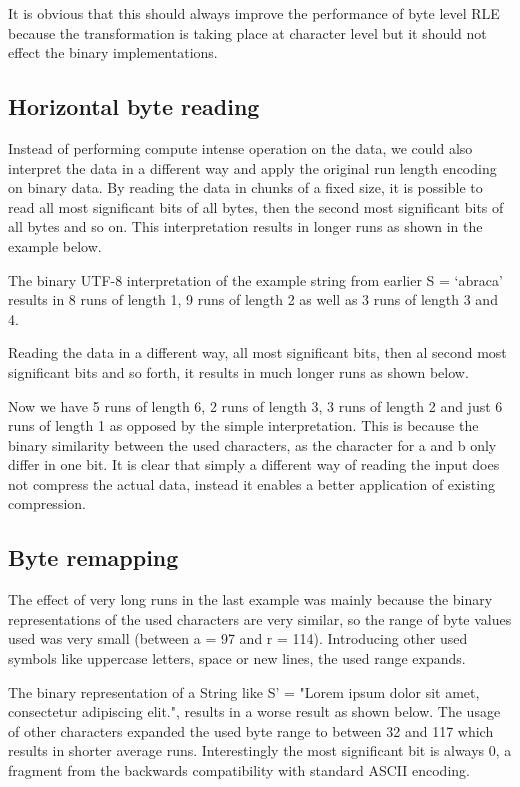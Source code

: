 \par{
It is obvious that this should always improve the performance of byte level RLE because the transformation is taking place at character level but it should not effect the binary implementations. 
}

\subsection{Horizontal byte reading}
\par{
Instead of performing compute intense operation on the data, we could also interpret the data in a different way and apply the original run length encoding on binary data. By reading the data in chunks of a fixed size, it is possible to read all most significant bits of all bytes, then the second most significant bits of all bytes and so on. This interpretation results in longer runs as shown in the example below.
}

\par{
The binary UTF-8 interpretation of the example string from earlier S = ‘abraca’ results in 8 runs of length 1, 9 runs of length 2 as well as 3 runs of length 3 and 4.  
\scalardump\dataA

Reading the data in a different way, all most significant bits, then al second most significant bits and so forth, it results in much longer runs as shown below.
\arraydump\dataA

Now we have 5 runs of length 6, 2 runs of length 3, 3 runs of length 2 and just 6 runs of length 1 as opposed by the simple interpretation. This is because the binary similarity between the used characters, as the character for a and b only differ in one bit. It is clear that simply a different way of reading the input does not compress the actual data, instead it enables a better application of existing compression. 
}

\subsection{Byte remapping}
\par{
The effect of very long runs in the last example was mainly because the binary representations of the used characters are very similar, so the range of byte values used was very small (between a = 97 and r = 114). Introducing other used symbols like uppercase letters, space or new lines, the used range expands.
}

\par{
The binary representation of a String like S' = "Lorem ipsum dolor sit amet, consectetur adipiscing elit.", results in a worse result as shown below. 
The usage of other characters expanded the used byte range to between 32 and 117 which results in shorter average runs. Interestingly the most significant bit is always 0, a fragment from the backwards compatibility with standard ASCII encoding.

\arraydump\dataB
}

